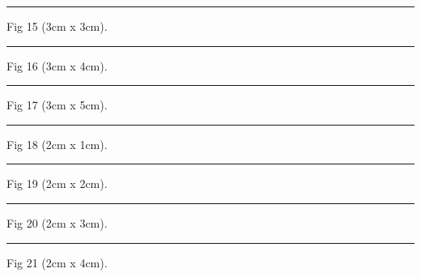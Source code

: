 \documentclass[a4paper,11pt]{article}
\begin{document}
\begin{swarmwrap}%
  \begin{minipage}[t]{3cm}
    \centering
    \rule{\linewidth}{3cm}
    {\footnotesize Fig 15 (3cm x 3cm).}
  \end{minipage}%
\end{swarmwrap}%
\swarmwrapnext
\lipsum[15]%

\begin{swarmwrap}%
  \begin{minipage}[t]{3cm}
    \centering
    \rule{\linewidth}{4cm}
    {\footnotesize Fig 16 (3cm x 4cm).}
  \end{minipage}%
\end{swarmwrap}%
\swarmwrapnext
\lipsum[16]%

\begin{swarmwrap}%
  \begin{minipage}[t]{3cm}
    \centering
    \rule{\linewidth}{5cm}
    {\footnotesize Fig 17 (3cm x 5cm).}
  \end{minipage}%
\end{swarmwrap}%
\swarmwrapnext
\lipsum[17]%

\begin{swarmwrap}%
  \begin{minipage}[t]{2cm}
    \centering
    \rule{\linewidth}{1cm}
    {\footnotesize Fig 18 (2cm x 1cm).}
  \end{minipage}%
\end{swarmwrap}%
\swarmwrapnext
\lipsum[18]%

\begin{swarmwrap}%
  \begin{minipage}[t]{2cm}
    \centering
    \rule{\linewidth}{2cm}
    {\footnotesize Fig 19 (2cm x 2cm).}
  \end{minipage}%
\end{swarmwrap}%
\swarmwrapnext
\lipsum[19]%

\begin{swarmwrap}%
  \begin{minipage}[t]{2cm}
    \centering
    \rule{\linewidth}{3cm}
    {\footnotesize Fig 20 (2cm x 3cm).}
  \end{minipage}%
\end{swarmwrap}%
\swarmwrapnext
\lipsum[20]%

\begin{swarmwrap}%
  \begin{minipage}[t]{2cm}
    \centering
    \rule{\linewidth}{4cm}
    {\footnotesize Fig 21 (2cm x 4cm).}
  \end{minipage}%
\end{swarmwrap}%
\swarmwrapnext
\lipsum[21]%
\end{document}

